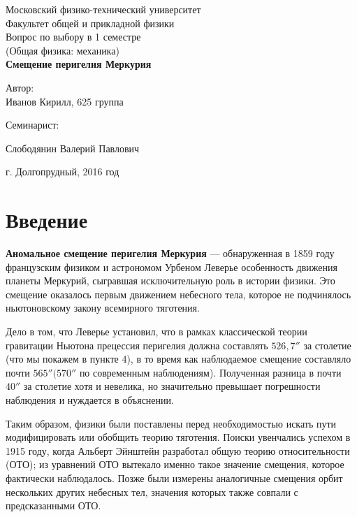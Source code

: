 \documentclass[12pt]{article}
\begin{document}
\begin{titlepage}		
\begin{center}
\large 	Московский физико-технический университет \\
Факультет общей и прикладной физики \\
\vspace{4.5cm}
\large Вопрос по выбору в 1 семестре \\(Общая физика: механика) \\ \vspace{0.7cm}
\LARGE \textbf{Смещение перигелия Меркурия}
\end{center}
\vspace{2.3cm} \large

\begin{center}
		 Автор: \\
 Иванов Кирилл,
 625 группа
\vspace{10mm}

Семинарист:

Слободянин Валерий Павлович
\end{center}

\begin{center} \vspace{70mm}
	г. Долгопрудный, 2016 год
\end{center}
\end{titlepage}

\section{Введение}
\textbf{Аномальное смещение перигелия Меркурия} — обнаруженная в 1859 году французским физиком и астрономом Урбеном Леверье особенность движения планеты Меркурий, сыгравшая исключительную роль в истории физики. 
Это смещение оказалось первым движением небесного тела, которое не подчинялось ньютоновскому закону всемирного тяготения.

Дело в том, что Леверье установил, что в рамках классической теории гравитации Ньютона прецессия перигелия должна составлять $ 526,7'' $ за столетие (что мы покажем в пункте 4), в то время как наблюдаемое смещение составляло почти $ 565'' (570''$  по современным наблюдениям). Полученная разница в почти $ 40'' $ за столетие хотя и невелика, но значительно превышает погрешности наблюдения и нуждается в объяснении.

Таким образом, физики были поставлены перед необходимостью искать пути модифицировать или обобщить теорию тяготения.
Поиски увенчались успехом в 1915 году, когда Альберт Эйнштейн разработал общую теорию относительности (ОТО); из уравнений ОТО вытекало именно такое значение смещения, которое фактически наблюдалось. Позже были измерены аналогичные смещения орбит нескольких других небесных тел, значения которых также совпали с предсказанными ОТО. 
\end{document}
